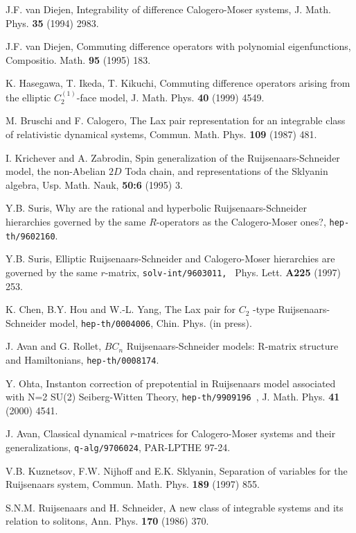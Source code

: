 \documentclass[a4paper,12pt]{article}
\begin{document}
\begin{thebibliography}{99}
  J.F. van Diejen, Integrability of difference Calogero-Moser
systems, J. Math. Phys. \textbf{35} (1994) 2983.

  J.F. van Diejen, Commuting difference operators with
polynomial eigenfunctions, Compositio. Math. \textbf{95}
(1995) 183.

  K. Hasegawa, T. Ikeda, T. Kikuchi, Commuting difference
operators arising from the elliptic $C_{2}^{(1)}$-face
model, J. Math. Phys. \textbf{40} (1999) 4549.


  M. Bruschi and F. Calogero, The Lax pair representation for an
integrable class of relativistic dynamical systems, Commun.
Math. Phys. \textbf{109} (1987) 481.

  I. Krichever and A. Zabrodin, Spin generalization of the
Ruijsenaars-Schneider model, the non-Abelian $2D$ Toda
chain, and representations of the Sklyanin algebra, Usp.
Math. Nauk, \textbf{50:6} (1995) 3.

  Y.B. Suris, Why are the rational and hyperbolic
Ruijsenaars-Schneider hierarchies governed by the same
$R$-operators as the Calogero-Moser ones?,
\texttt{hep-th/9602160}.

  Y.B. Suris, Elliptic Ruijsenaars-Schneider and Calogero-Moser
hierarchies are governed by the same $r$-matrix,
\texttt{solv-int/9603011, } Phys. Lett. \textbf{A225}
(1997) 253.

	K. Chen, B.Y. Hou and W.-L. Yang, The Lax pair for $C_{2}$
-type Ruijsenaars-Schneider model, \texttt{hep-th/0004006}, Chin. Phys.
(in press).

	J. Avan and G. Rollet, $BC_{n}$ Ruijsenaars-Schneider
models: R-matrix structure and Hamiltonians,
\texttt{hep-th/0008174}.


	Y. Ohta, Instanton correction of prepotential in Ruijsenaars
model associated with N=2 SU(2) Seiberg-Witten Theory,
\texttt{hep-th/9909196 },  J. Math. Phys. \textbf{41} (2000)
4541.

	 J. Avan, Classical dynamical $r$-matrices for
Calogero-Moser systems and their generalizations, \texttt{q-alg/9706024},
PAR-LPTHE 97-24.

  V.B. Kuznetsov, F.W. Nijhoff and E.K. Sklyanin, Separation of
variables for the Ruijsenaars system, Commun. Math. Phys.
\textbf{189} (1997) 855.

  S.N.M. Ruijsenaars and H. Schneider, A new class of integrable
systems and its relation to solitons, Ann. Phys.
\textbf{170} (1986) 370.


\end{thebibliography}
\end{document}

